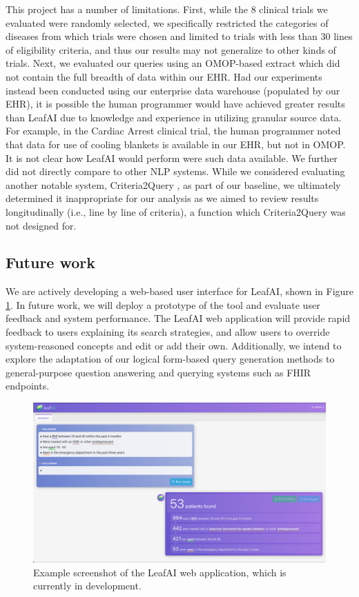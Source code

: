 \documentclass[../main.tex]{subfiles}
\begin{document}
This project has a number of limitations. First, while the 8 clinical trials we evaluated were randomly selected, we specifically restricted the categories of diseases from which trials were chosen and limited to trials with less than 30 lines of eligibility criteria, and thus our results may not generalize to other kinds of trials. Next, we evaluated our queries using an OMOP-based extract which did not contain the full breadth of data within our EHR. Had our experiments instead been conducted using our enterprise data warehouse (populated by our EHR), it is possible the human programmer would have achieved greater results than LeafAI due to knowledge and experience in utilizing granular source data. For example, in the Cardiac Arrest clinical trial, the human programmer noted that data for use of cooling blankets is available in our EHR, but not in OMOP. It is not clear how LeafAI would perform were such data available. We further did not directly compare to other NLP systems. While we considered evaluating another notable system, Criteria2Query \cite{yuan2019criteria2query}, as part of our baseline, we ultimately determined it inappropriate for our analysis as we aimed to review results longitudinally (i.e., line by line of criteria), a function which Criteria2Query was not designed for. 

\subsection*{Future work}

We are actively developing a web-based user interface for LeafAI, shown in Figure \ref{fig_leafai_screenshot}. In future work, we will deploy a prototype of the tool and evaluate user feedback and system performance. The LeafAI web application will provide rapid feedback to users explaining its search strategies, and allow users to override system-reasoned concepts and edit or add their own. Additionally, we intend to explore the adaptation of our logical form-based query generation methods to general-purpose question answering and querying systems such as FHIR endpoints.

\begin{figure}[H]
  \includegraphics[scale=0.26]{figures/leafai_screenshot.png}  
\caption{Example screenshot of the LeafAI web application, which is currently in development.}
\label{fig_leafai_screenshot}
\end{figure}
\end{document}
